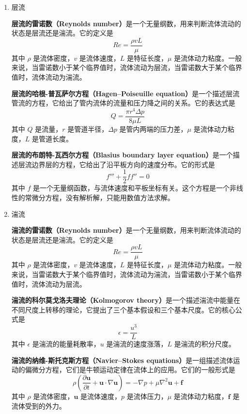 \documentclass[dvipsnames, svgnames,a4paper,11pt]{article}
\begin{document}
\begin{enumerate}
		\textbf{另一个适合使用在热力学的公式:}
		\[ h + \frac{1}{2} v^2 + gz = \text{constant} \]
		这个方程表示在可压缩流体的等焓流动中，沿着流线的任意两点，流体的比焓、动能和重力势能之和是一个常数。其中，$h$是比焓，表示单位质量的流体的焓，等于比内能加上比压力功，即$h = e + \frac{p}{\rho}$。这个方程可以用来分析流体的温度、压力和速度之间的关系，例如气体从高温高压的容器中喷出时，温度会降低，速度会增加。
		
		\item 层流
		
		\textbf{层流的雷诺数（Reynolds number）}是一个无量纲数，用来判断流体流动的状态是层流还是湍流。它的定义是
		\[ Re=\frac{\rho v L}{\mu} \]
		其中 $\rho$ 是流体密度，$v$ 是流体速度，$L$ 是特征长度，$\mu$ 是流体动力粘度。一般来说，当雷诺数小于某个临界值时，流体流动为层流，当雷诺数大于某个临界值时，流体流动为湍流。
		
		\textbf{层流的哈根-普瓦萨尔方程（Hagen–Poiseuille equation）}是一个描述层流管流的方程，它给出了管内流体的流量和压力降之间的关系。它的表达式是
		\[ Q=\frac{\pi r^4 \Delta p}{8 \mu L} \]
		其中 $Q$ 是流量，$r$ 是管道半径，$\Delta p$ 是管内两端的压力差，$\mu$ 是流体动力粘度，$L$ 是管道长度。
		
		\textbf{层流的布朗特-瓦西尔方程（Blasius boundary layer equation）}是一个描述层流边界层的方程，它给出了沿平板方向的速度分布。它的形式是
		\[ f''' + \frac{1}{2} f f'' = 0 \]
		其中 $f$ 是一个无量纲函数，与流体速度和平板坐标有关。这个方程是一个非线性的常微分方程，没有解析解，只能用数值方法求解。
		
		\item 湍流
		
		\textbf{湍流的雷诺数（Reynolds number）}是一个无量纲数，用来判断流体流动的状态是层流还是湍流。它的定义是
		\[ Re=\frac{\rho v L}{\mu} \]
		其中 $\rho$ 是流体密度，$v$ 是流体速度，$L$ 是特征长度，$\mu$ 是流体动力粘度。一般来说，当雷诺数大于某个临界值时，流体流动为湍流，当雷诺数小于某个临界值时，流体流动为层流。
		
		\textbf{湍流的科尔莫戈洛夫理论（Kolmogorov theory）}是一个描述湍流中能量在不同尺度上转移的理论，它提出了三个基本假设和三个基本尺度。它的核心公式是
		\[ \epsilon = \frac{u^3}{L} \]
		其中 $\epsilon$ 是湍流的能量耗散率，$u$ 是湍流的速度涨落，$L$ 是湍流的积分尺度。
		
		\textbf{湍流的纳维-斯托克斯方程（Navier–Stokes equations）}是一组描述流体运动的偏微分方程，它们是牛顿运动定律在流体上的应用。它们的一般形式是
		\[ \rho \left(\frac{\partial \mathbf{u}}{\partial t} + \mathbf{u} \cdot \nabla \mathbf{u}\right) = -\nabla p + \mu \nabla^2 \mathbf{u} + \mathbf{f} \]
		其中 $\rho$ 是流体密度，$\mathbf{u}$ 是流体速度，$p$ 是流体压力，$\mu$ 是流体动力粘度，$\mathbf{f}$ 是流体受到的外力。
		

\end{enumerate}
\end{document}
